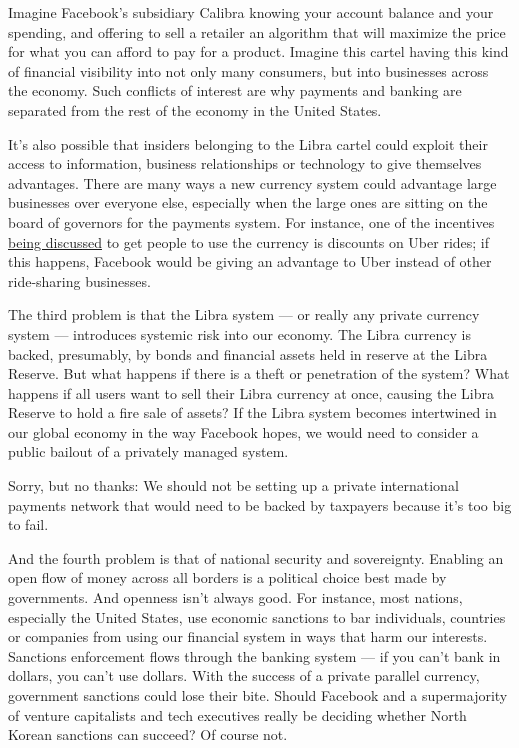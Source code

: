 Imagine Facebook's subsidiary Calibra knowing your account balance and
your spending, and offering to sell a retailer an algorithm that will
maximize the price for what you can afford to pay for a product. Imagine
this cartel having this kind of financial visibility into not only many
consumers, but into businesses across the economy. Such conflicts of
interest are why payments and banking are separated from the rest of the
economy in the United States.

It's also possible that insiders belonging to the Libra cartel could
exploit their access to information, business relationships or
technology to give themselves advantages. There are many ways a new
currency system could advantage large businesses over everyone else,
especially when the large ones are sitting on the board of governors for
the payments system. For instance, one of the incentives
\href{https://abc7chicago.com/business/facebook-launching-its-own-currency-for-2-billion-plus-users/5351232/}{being
discussed} to get people to use the currency is discounts on Uber rides;
if this happens, Facebook would be giving an advantage to Uber instead
of other ride-sharing businesses.

The third problem is that the Libra system --- or really any private
currency system --- introduces systemic risk into our economy. The Libra
currency is backed, presumably, by bonds and financial assets held in
reserve at the Libra Reserve. But what happens if there is a theft or
penetration of the system? What happens if all users want to sell their
Libra currency at once, causing the Libra Reserve to hold a fire sale of
assets? If the Libra system becomes intertwined in our global economy in
the way Facebook hopes, we would need to consider a public bailout of a
privately managed system.

Sorry, but no thanks: We should not be setting up a private
international payments network that would need to be backed by taxpayers
because it's too big to fail.

And the fourth problem is that of national security and sovereignty.
Enabling an open flow of money across all borders is a political choice
best made by governments. And openness isn't always good. For instance,
most nations, especially the United States, use economic sanctions to
bar individuals, countries or companies from using our financial system
in ways that harm our interests. Sanctions enforcement flows through the
banking system --- if you can't bank in dollars, you can't use dollars.
With the success of a private parallel currency, government sanctions
could lose their bite. Should Facebook and a supermajority of venture
capitalists and tech executives really be deciding whether North Korean
sanctions can succeed? Of course not.

